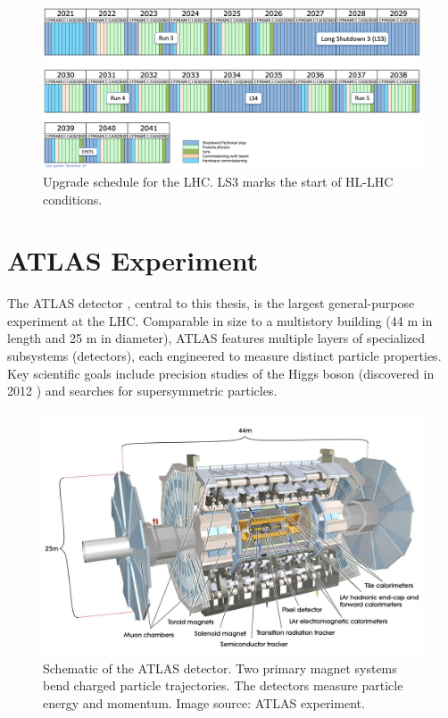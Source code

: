 \begin{figure}[H]
\centering
\includegraphics[width=\textwidth]{images/introduction/LHC-schedule.png}
\caption[Upgrade schedule for the LHC]{Upgrade schedule for the LHC. LS3 marks the start of HL-LHC conditions. \protect\cite{lhc_upgrade_schedule}}
\label{fig:LHC-schedule}
\end{figure}

\clearpage
\section{ATLAS Experiment}

The \acs{ATLAS} detector \cite{atlas-experiment}, central to this thesis, is the largest general-purpose experiment at the \acs{LHC}. Comparable in size to a multistory building (44 m in length and 25 m in diameter), \acs{ATLAS} features multiple layers of specialized subsystems (detectors), each engineered to measure distinct particle properties. Key scientific goals include precision studies of the Higgs boson (discovered in 2012 \cite{atlas-higgs-discovery}) and searches for supersymmetric particles.

\begin{figure}[H]
\centering
\includegraphics[width=\textwidth]{images/introduction/atlas-model.jpg}
\caption[Schematic of the ATLAS detector]{Schematic of the \acs{ATLAS} detector. Two primary magnet systems bend charged particle trajectories. The detectors measure particle energy and momentum. Image source: \acs{ATLAS} experiment. \protect\cite{atlas-experiment}}
\label{fig:atlas-model}
\end{figure}

